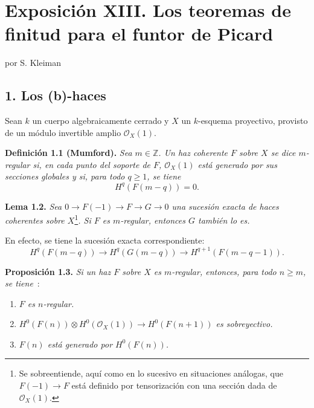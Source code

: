 
\section*{Exposición XIII. Los teoremas de finitud para el funtor de Picard}
\begin{center}
por S. Kleiman
\end{center}

\subsection*{1. Los (b)-haces}
Sean $k$ un cuerpo algebraicamente cerrado y $X$ un $k$-esquema proyectivo,
provisto de un módulo invertible amplio $\mathcal O_X(1)$.

\textbf{Definición 1.1 (Mumford).} \emph{Sea $m\in\mathbb Z$. Un haz
coherente $F$ sobre $X$ se dice \emph{$m$-regular} si, en cada punto del
soporte de $F$, $\mathcal O_X(1)$ está generado por sus secciones globales y
si, para todo $q\ge1$, se tiene}
\[
 H^q(F(m-q))=0.
\]

\textbf{Lema 1.2.} \emph{Sea
\(0\longrightarrow F(-1)\longrightarrow F\longrightarrow G\longrightarrow 0\)
una sucesión exacta de haces coherentes sobre $X$}\footnote{Se sobreentiende,
aquí como en lo sucesivo en situaciones análogas, que \(F(-1)\to F\) está
definido por tensorización con una sección dada de
\(\mathcal O_X(1)\).}\emph{. Si $F$ es $m$-regular, entonces $G$ también lo
es.}

En efecto, se tiene la sucesión exacta correspondiente:
\[
H^q(F(m-q))\longrightarrow H^q(G(m-q))\longrightarrow H^{q+1}(F(m-q-1)).
\]

\textbf{Proposición 1.3.} \emph{Si un haz $F$ sobre $X$ es $m$-regular,
entonces, para todo $n\ge m$, se tiene}~:
\begin{enumerate}[label=(\roman*)]
\item \emph{$F$ es $n$-regular.}
\item \emph{\(H^0(F(n))\otimes H^0(\mathcal O_X(1))\longrightarrow H^0(F(n+1))\) es sobreyectivo.}
\item \emph{$F(n)$ está generado por \(H^0(F(n))\).}
\end{enumerate}

